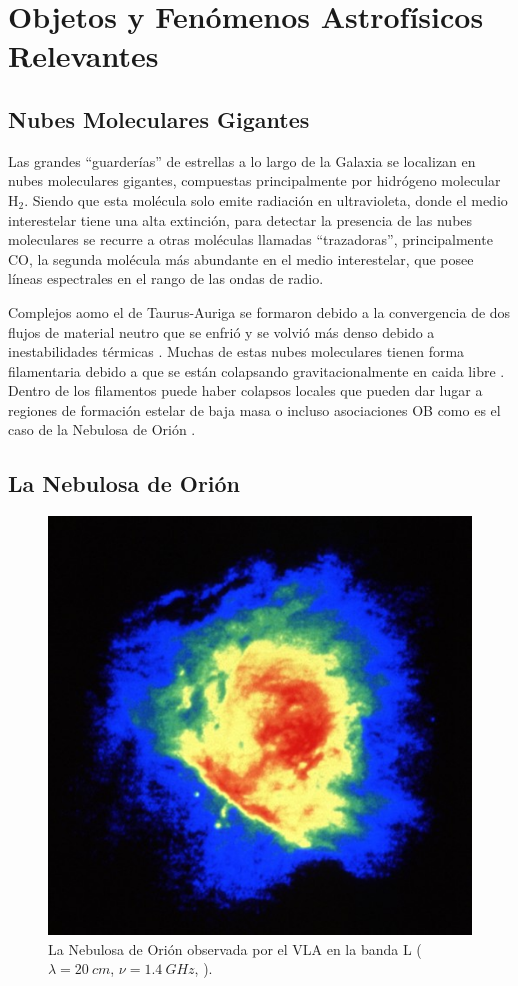 \chapter[Objetos Relevantes]{Objetos y Fenómenos Astrofísicos Relevantes}
\thispagestyle{empty}
\section{Nubes Moleculares Gigantes}

Las grandes ``guarderías'' de estrellas a lo largo de la Galaxia se localizan en nubes moleculares gigantes, compuestas principalmente por hidrógeno molecular $\mathrm{H_2}$.
Siendo que esta molécula solo emite radiación en ultravioleta, donde el medio interestelar tiene una alta extinción, para detectar la presencia de las nubes moleculares se recurre a otras moléculas llamadas ``trazadoras'', principalmente $\mathrm{CO}$, la segunda molécula más abundante en el medio interestelar, que posee líneas espectrales en el rango de las ondas de radio.

Complejos aomo el de Taurus-Auriga se formaron debido a la convergencia de dos flujos de material neutro \citep{Ballesteros:1999} que se enfrió y se volvió más denso debido a inestabilidades térmicas \citep{Hennebelle:1999}. Muchas de estas nubes moleculares tienen forma filamentaria debido a que se están colapsando gravitacionalmente en caida libre \citep{Ballesteros:2011}. Dentro de los filamentos puede haber colapsos locales que pueden dar lugar a regiones de formación estelar de baja masa o incluso asociaciones OB como es el caso de la Nebulosa de Orión \citep{Hartmann:2007}.

\section{La Nebulosa de Orión}

\begin{figure}
    \includegraphics[width=0.5\linewidth]{./Figures/OrionVR13A} 
  \caption{La Nebulosa de Orión observada por el VLA en la banda L ($\lambda = \SI{20}{cm}$, $\nu = \SI{1.4}{GHz}$, \citet{Yusef:1990}).}
\end{figure}

